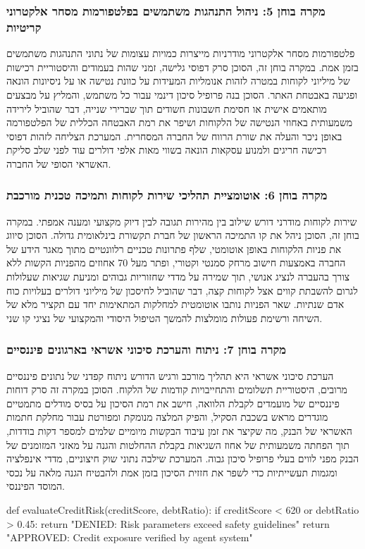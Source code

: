 \documentclass{hebrew-academic-template}
\begin{document}
\subsubsection{מקרה בוחן 5: ניהול התנהגות משתמשים בפלטפורמות מסחר אלקטרוני קריטיות}
פלטפורמות מסחר אלקטרוני מודרניות מייצרות כמויות עצומות של נתוני התנהגות משתמשים בזמן אמת. במקרה בוחן זה, הסוכן סרק דפוסי גלישה, זמני שהות בעמודים והיסטוריית רכישות של מיליוני לקוחות במטרה לזהות אנומליות המעידות על כוונת נטישה או על ניסיונות הונאה ופגיעה באבטחת האתר. הסוכן בנה פרופיל סיכון דינמי עבור כל משתמש, והמליץ על מבצעים מותאמים אישית או חסימת חשבונות חשודים תוך שברירי שנייה, דבר שהוביל לירידה משמעותית באחוזי הנטישה של הלקוחות ושיפר את רמת האבטחה הכללית של הפלטפורמה באופן ניכר והעלה את שורת הרווח של החברה המסחרית. המערכת הצליחה לזהות דפוסי רכישה חריגים ולמנוע עסקאות הונאה בשווי מאות אלפי דולרים עוד לפני שלב סליקת האשראי הסופי של החברה.

\subsubsection{מקרה בוחן 6: אוטומציית תהליכי שירות לקוחות ותמיכה טכנית מורכבת}
שירות לקוחות מודרני דורש שילוב בין מהירות תגובה לבין דיוק מקצועי ומענה אמפתי. במקרה בוחן זה, הסוכן ניהל את קו התמיכה הראשון של חברת תקשורת בינלאומית גדולה. הסוכן סיווג את פניות הלקוחות באופן אוטומטי, שלף פתרונות טכניים רלוונטיים מתוך מאגר הידע של החברה באמצעות חישוב מרחק סמנטי וקטורי, ופתר מעל 70 אחוזים מהפניות הקשות ללא צורך בהעברה לנציג אנושי, תוך שמירה על מדדי שחזוריות גבוהים ומניעת שגיאות שעלולות לגרום להשבתת קווים אצל לקוחות קצה, דבר שהוביל לחיסכון של מיליוני דולרים בעלויות כוח אדם שנתיות. שאר הפניות נותבו אוטומטית למחלקות המתאימות יחד עם תקציר מלא של השיחה ורשימת פעולות מומלצות להמשך הטיפול היסודי והמקצועי של נציגי קו שני.

\subsubsection{מקרה בוחן 7: ניתוח והערכת סיכוני אשראי בארגונים פיננסיים}
הערכת סיכוני אשראי היא תהליך מורכב ורגיש הדורש ניתוח קפדני של נתונים פיננסיים מרובים, היסטוריית תשלומים והתחייבויות קודמות של הלקוח. הסוכן במקרה זה סרק דוחות פיננסיים של מועמדים לקבלת הלוואה, חישב את רמת הסיכון על בסיס מודלים מתמטיים מוגדרים מראש בשכבת הסקיל, והפיק המלצה מנומקת ומפורטת עבור מחלקת חתמות האשראי של הבנק, מה שקיצר את זמן עיבוד הבקשות מיומיים שלמים למספר דקות בודדות, תוך הפחתה משמעותית של אחוז השגיאות בקבלת ההחלטות והגנה על מאזני המזומנים של הבנק מפני לווים בעלי פרופיל סיכון גבוה. המערכת שילבה נתוני שוק חיצוניים, מדדי אינפלציה ומגמות תעשייתיות כדי לשפר את חזזית הסיכון בזמן אמת ולהבטיח הגנה מלאה על נכסי המוסד הפיננסי.
\begin{pythonbox}
def evaluateCreditRisk(creditScore, debtRatio):
    if creditScore < 620 or debtRatio > 0.45:
        return "DENIED: Risk parameters exceed safety guidelines"
    return "APPROVED: Credit exposure verified by agent system"
\end{pythonbox}
\end{document}
